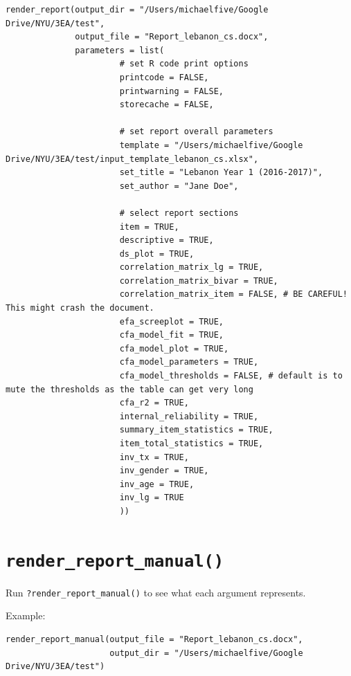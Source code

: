 \documentclass[
]{book}
\begin{document}
\begin{verbatim}
render_report(output_dir = "/Users/michaelfive/Google Drive/NYU/3EA/test",
              output_file = "Report_lebanon_cs.docx",
              parameters = list(
                       # set R code print options
                       printcode = FALSE,
                       printwarning = FALSE,
                       storecache = FALSE,

                       # set report overall parameters
                       template = "/Users/michaelfive/Google Drive/NYU/3EA/test/input_template_lebanon_cs.xlsx",
                       set_title = "Lebanon Year 1 (2016-2017)",
                       set_author = "Jane Doe",

                       # select report sections
                       item = TRUE,
                       descriptive = TRUE,
                       ds_plot = TRUE,
                       correlation_matrix_lg = TRUE,
                       correlation_matrix_bivar = TRUE,
                       correlation_matrix_item = FALSE, # BE CAREFUL! This might crash the document.
                       efa_screeplot = TRUE,
                       cfa_model_fit = TRUE,
                       cfa_model_plot = TRUE,
                       cfa_model_parameters = TRUE,
                       cfa_model_thresholds = FALSE, # default is to mute the thresholds as the table can get very long
                       cfa_r2 = TRUE,
                       internal_reliability = TRUE,
                       summary_item_statistics = TRUE,
                       item_total_statistics = TRUE,
                       inv_tx = TRUE,
                       inv_gender = TRUE,
                       inv_age = TRUE,
                       inv_lg = TRUE
                       ))
\end{verbatim}

\hypertarget{render_report_manual}{%
\section{\texorpdfstring{\texttt{render\_report\_manual()}}{render\_report\_manual()}}\label{render_report_manual}}

Run \texttt{?render\_report\_manual()} to see what each argument represents.

Example:

\begin{verbatim}
render_report_manual(output_file = "Report_lebanon_cs.docx",
                     output_dir = "/Users/michaelfive/Google Drive/NYU/3EA/test")
\end{verbatim}
\end{document}
